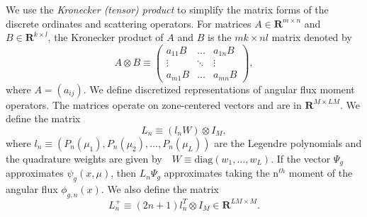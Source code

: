 We use the \textit{Kronecker (tensor) product} to simplify the matrix forms of the discrete ordinates and scattering operators. For matrices $A \in \mathbf{R}^{m \times n}$ and $B \in \mathbf{R}^{k \times l}$, the Kronecker product of $A$ and $B$ is the $mk \times nl$ matrix denoted by
\begin{equation*}
	A \otimes B \equiv \begin{pmatrix}
					a_{11}B & \dots & a_{1n}B \\
					\vdots & \ddots & \vdots \\
					a_{m1}B & \dots & a_{mn}B
				    \end{pmatrix},
\end{equation*}
where $ A = (a_{ij})$. 
We define discretized representations of angular flux moment operators. The matrices operate on zone-centered vectors and are in $\mathbf{R}^{M \times LM}$. We define the matrix
\begin{equation*}
	L_{n} \equiv (l_{n}W) \otimes I_{M},
\end{equation*}
where $l_{n} \equiv (P_{n}(\mu_{1}), P_{n}(\mu_{2}), \dots, P_{n}(\mu_{L}))$ are the Legendre polynomials and the quadrature weights are given by$\quad W \equiv \text{diag}(w_{1}, \dots, w_{L})$.
If the vector $\Psi_{g}$ approximates $\psi_{g}(x, \mu)$, then $L_{n}\Psi_{g}$ approximates taking the n$^{th}$ moment of the angular flux $\phi_{g,n}(x)$. We also define the matrix
\begin{equation*}
	L_{n}^{+} \equiv (2n+1)l_{n}^{T} \otimes I_{M} \in \mathbf{R}^{LM \times M}.
\end{equation*}
